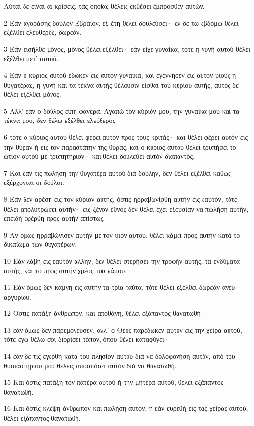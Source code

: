 \par Αύται δε είναι αι κρίσεις, τας οποίας θέλεις εκθέσει έμπροσθεν αυτών.
\par 2 Εάν αγοράσης δούλον Εβραίον, εξ έτη θέλει δουλεύσει· εν δε τω εβδόμω θέλει εξέλθει ελεύθερος, δωρεάν.
\par 3 Εάν εισήλθε μόνος, μόνος θέλει εξέλθει· εάν είχε γυναίκα, τότε η γυνή αυτού θέλει εξέλθει μετ' αυτού.
\par 4 Εάν ο κύριος αυτού έδωκεν εις αυτόν γυναίκα, και εγέννησεν εις αυτόν υιούς η θυγατέρας, η γυνή και τα τέκνα αυτής θέλουσιν είσθαι του κυρίου αυτής, αυτός δε θέλει εξέλθει μόνος.
\par 5 Αλλ' εάν ο δούλος είπη φανερά, Αγαπώ τον κύριόν μου, την γυναίκα μου και τα τέκνα μου, δεν θέλω εξέλθει ελεύθερος·
\par 6 τότε ο κύριος αυτού θέλει φέρει αυτόν προς τους κριτάς· και θέλει φέρει αυτόν εις την θύραν ή εις τον παραστάτην της θύρας, και ο κύριος αυτού θέλει τρυπήσει το ωτίον αυτού με τρυπητήριον· και θέλει δουλεύει αυτόν διαπαντός.
\par 7 Και εάν τις πωλήση την θυγατέρα αυτού διά δούλην, δεν θέλει εξέλθει καθώς εξέρχονται οι δούλοι.
\par 8 Εάν δεν αρέση εις τον κύριον αυτής, όστις ηρραβωνίσθη αυτήν εις εαυτόν, τότε θέλει απολυτρώσει αυτήν· εις ξένον έθνος δεν θέλει έχει εξουσίαν να πωλήση αυτήν, επειδή εφέρθη προς αυτήν απίστως.
\par 9 Αν όμως ηρραβώνισεν αυτήν με τον υιόν αυτού, θέλει κάμει προς αυτήν κατά το δικαίωμα των θυγατέρων.
\par 10 Εάν λάβη εις εαυτόν άλλην, δεν θέλει στερήσει την τροφήν αυτής, τα ενδύματα αυτής, και το προς αυτήν χρέος του γάμου.
\par 11 Εάν όμως δεν κάμνη εις αυτήν τα τρία ταύτα, τότε θέλει εξέλθει δωρεάν άνευ αργυρίου.
\par 12 Όστις πατάξη άνθρωπον, και αποθάνη, θέλει εξάπαντος θανατωθή·
\par 13 εάν όμως δεν παρεμόνευσεν, αλλ' ο Θεός παρέδωκεν αυτόν εις την χείρα αυτού, τότε εγώ θέλω σοι διορίσει τόπον, όπου θέλει καταφύγει·
\par 14 εάν δε τις εγερθή κατά του πλησίον αυτού διά να δολοφονήση αυτόν, από του θυσιαστηρίου μου θέλεις αποσπάσει αυτόν διά να θανατωθή.
\par 15 Και όστις πατάξη τον πατέρα αυτού ή την μητέρα αυτού, θέλει εξάπαντος θανατωθή.
\par 16 Και όστις κλέψη άνθρωπον και πωλήση αυτόν, ή εάν ευρεθή εις τας χείρας αυτού, θέλει εξάπαντος θανατωθή.
